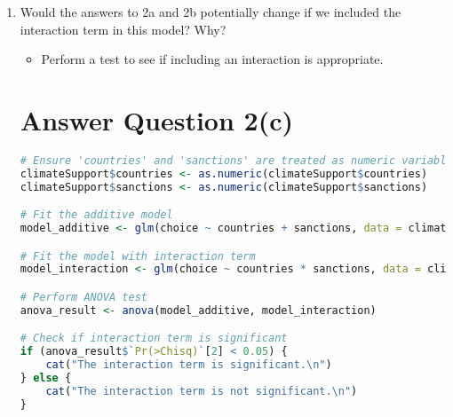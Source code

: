 \documentclass[12pt,letterpaper]{article}
\begin{document}
\begin{enumerate}
\begin{enumerate}
		\begin{lstlisting}[language=R]
# Ensure 'countries' and 'sanctions' are treated as numeric variables
climateSupport$countries <- as.numeric(climateSupport$countries)
climateSupport$sanctions <- as.numeric(climateSupport$sanctions)

# Fit the additive model
model_additive <- glm(choice ~ countries + sanctions, data = climateSupport, family = binomial)

# Predict the probability for 80 of 192 countries participating with no sanctions
pred_80_no_sanctions <- predict(model_additive, newdata = data.frame(countries = 80, sanctions = 0), type = "response")
		\end{lstlisting}		
		
		\item
		Would the answers to 2a and 2b potentially change if we included the interaction term in this model? Why? 
		\begin{itemize}
			\item Perform a test to see if including an interaction is appropriate.
		\end{itemize}
		
			\section*{Answer Question 2(c)}
		
		\begin{lstlisting}[language=R]
# Ensure 'countries' and 'sanctions' are treated as numeric variables
climateSupport$countries <- as.numeric(climateSupport$countries)
climateSupport$sanctions <- as.numeric(climateSupport$sanctions)

# Fit the additive model
model_additive <- glm(choice ~ countries + sanctions, data = climateSupport, family = binomial)

# Fit the model with interaction term
model_interaction <- glm(choice ~ countries * sanctions, data = climateSupport, family = binomial)

# Perform ANOVA test
anova_result <- anova(model_additive, model_interaction)

# Check if interaction term is significant
if (anova_result$`Pr(>Chisq)`[2] < 0.05) {
	cat("The interaction term is significant.\n")
} else {
	cat("The interaction term is not significant.\n")
}
		\end{lstlisting}
		

\end{enumerate}
\end{enumerate}
\end{document}
